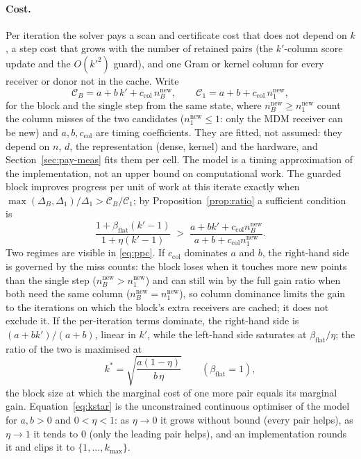 \paragraph{Cost.} Per iteration the solver pays a scan and certificate
cost that does not depend on $k$, a step cost that grows with the number
of retained pairs (the $k'$-column score update and the $O(k'^2)$ guard), and one Gram or kernel column for every
receiver or donor not in the cache. Write
\[
\mathcal C_B=a+b\,k'+c_{\mathrm{col}}\,n^{\mathrm{new}}_B,\qquad \mathcal C_1=a+b+c_{\mathrm{col}}\,n^{\mathrm{new}}_1,
\]
for the block and the single step from the same state, where $n^{\mathrm{new}}_B\ge n^{\mathrm{new}}_1$
count the column misses of the two candidates ($n^{\mathrm{new}}_1\le1$: only the MDM
receiver can be new) and $a,b,c_{\mathrm{col}}$ are timing coefficients.
They are fitted, not assumed: they depend on $n$, $d$, the
representation (dense, kernel) and the hardware, and
Section~\ref{sec:pay-meas} fits them per cell. The model is a timing
approximation of the implementation, not an upper bound on
computational work. The guarded block improves progress per unit of work at this
iterate exactly when
$\max(\Delta_B,\Delta_1)/\Delta_1>\mathcal C_B/\mathcal C_1$; by
Proposition~\ref{prop:ratio} a sufficient condition is
\begin{equation}\label{eq:ppc}
\frac{1+\beta_{\mathrm{flat}}(k'-1)}{1+\eta(k'-1)}\;>\;\frac{a+bk'+c_{\mathrm{col}}n^{\mathrm{new}}_B}{a+b+c_{\mathrm{col}}n^{\mathrm{new}}_1}.
\end{equation}
Two regimes are visible in \eqref{eq:ppc}. If $c_{\mathrm{col}}$
dominates $a$ and $b$, the right-hand side is governed by the miss
counts: the block loses when it touches more new points than the single
step ($n^{\mathrm{new}}_B>n^{\mathrm{new}}_1$) and can still win by the full gain ratio when both
need the same column ($n^{\mathrm{new}}_B=n^{\mathrm{new}}_1$), so column dominance limits the gain
to the iterations on which the block's extra receivers are cached; it
does not exclude it. If the per-iteration terms dominate, the
right-hand side is $(a+bk')/(a+b)$, linear in $k'$, while the left-hand
side saturates at $\beta_{\mathrm{flat}}/\eta$; the ratio of the two is maximised at
\begin{equation}\label{eq:kstar}
k^*=\sqrt{\frac{a(1-\eta)}{b\,\eta}}\qquad(\beta_{\mathrm{flat}}=1),
\end{equation}
the block size at which the marginal cost of one more pair equals its
marginal gain. Equation~\eqref{eq:kstar} is the unconstrained continuous
optimiser of the model for $a,b>0$ and $0<\eta<1$: as $\eta\to0$ it grows
without bound (every pair helps), as $\eta\to1$ it tends to $0$ (only the
leading pair helps), and an implementation rounds it and clips it to
$\{1,\dots,k_{\max}\}$.

